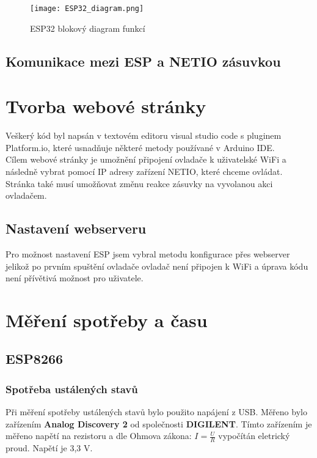 \documentclass[a4paper, 12pt]{report}
\begin{document}
				\begin{figure}[h]
					\centering
					\texttt{[image: ESP32\_diagram.png]}
					\caption{ESP32 blokový diagram funkcí}
					\label{ESP32_diagram}
				\end{figure}



		\section{Komunikace mezi ESP a NETIO zásuvkou}

	\chapter{Tvorba webové stránky}
		Veškerý kód byl napsán v textovém editoru visual studio code s pluginem Platform.io, které usnadňuje některé metody používané v Arduino IDE.\\
		Cílem webové stránky je umožnění připojení ovladače k uživatelské WiFi a následně vybrat pomocí IP adresy zařízení NETIO, které chceme ovládat. Stránka také musí umožňovat změnu reakce zásuvky na vyvolanou akci ovladačem.
		\section{Nastavení webserveru}
			Pro možnost nastavení ESP jsem vybral metodu konfigurace přes webserver jelikož po prvním spuštění ovladače ovladač není připojen k WiFi a úprava kódu není přívětivá možnost pro uživatele. 

	\chapter{Měření spotřeby a času}
		\section{ESP8266}

			\subsection{Spotřeba ustálených stavů}
				Při měření spotřeby ustálených stavů bylo použito napájení z USB. Měřeno bylo zařízením \textbf{Analog Discovery 2} od společnosti \textbf{DIGILENT}. Tímto zařízením je měřeno napětí na rezistoru a dle Ohmova zákona: $I =\frac{U}{R}$ vypočítán eletrický proud. Napětí je 3,3 V.
\end{document}
